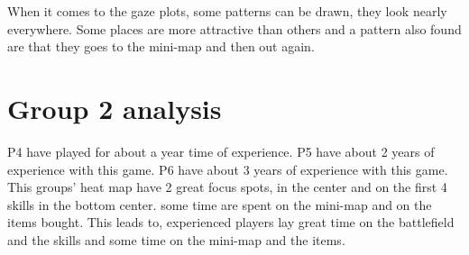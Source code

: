 \documentclass[notitlepage]{report}
\begin{document}
When it comes to the gaze plots, some patterns can be drawn, they look nearly everywhere. Some places are more attractive than others and a pattern also found are that they goes to the mini-map and then out again.

\section{Group 2 analysis}
P4 have played for about a year time of experience. P5 have about 2 years of experience with this game. P6 have about 3 years of experience with this game. This groups' heat map have 2 great focus spots, in the center and on the first 4 skills in the bottom center. some time are spent on the mini-map and on the items bought. This leads to, experienced players lay great time on the battlefield and the skills and some time on the mini-map and the items.
\end{document}
